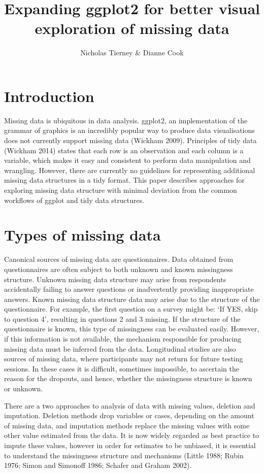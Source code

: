 \documentclass[]{article}
\title{Expanding ggplot2 for better visual exploration of missing data}
\author{Nicholas Tierney \& Dianne Cook}
\date{}
\begin{document}
\maketitle

\section{Introduction}\label{introduction}

Missing data is ubiquitous in data analysis. ggplot2, an implementation
of the grammar of graphics is an incredibly popular way to produce data
visualisations does not currently support missing data (Wickham 2009).
Principles of tidy data (Wickham 2014) states that each row is an
observation and each column is a variable, which makes it easy and
consistent to perform data manipulation and wrangling. However, there
are currently no guidelines for representing additional missing data
structures in a tidy format. This paper describes approaches for
exploring missing data structure with minimal deviation from the common
workflows of ggplot and tidy data structures.

\section{Types of missing data}\label{types-of-missing-data}

Canonical sources of missing data are questionnaires. Data obtained from
questionnaires are often subject to both unknown and known missingness
structure. Unknown missing data structure may arise from respondents
accidentally failing to answer questions or inadvertently providing
inappropriate answers. Known missing data structure data may arise due
to the structure of the questionnaire. For example, the first question
on a survey might be: `If YES, skip to question 4', resulting in
questions 2 and 3 missing. If the structure of the questionnaire is
known, this type of missingness can be evaluated easily. However, if
this information is not available, the mechanism responsible for
producing missing data must be inferred from the data. Longitudinal
studies are also sources of missing data, where participants may not
return for future testing sessions. In these cases it is difficult,
sometimes impossible, to ascertain the reason for the dropouts, and
hence, whether the missingness structure is known or unknown.

There are a two approaches to analysis of data with missing values,
deletion and imputation. Deletion methods drop variables or cases,
depending on the amount of missing data, and imputation methods replace
the missing values with some other value estimated from the data. It is
now widely regarded as best practice to impute these values, however in
order for estimates to be unbiased, it is essential to understand the
missingness structure and mechanisms (Little 1988; Rubin 1976; Simon and
Simonoff 1986; Schafer and Graham 2002).
\end{document}
